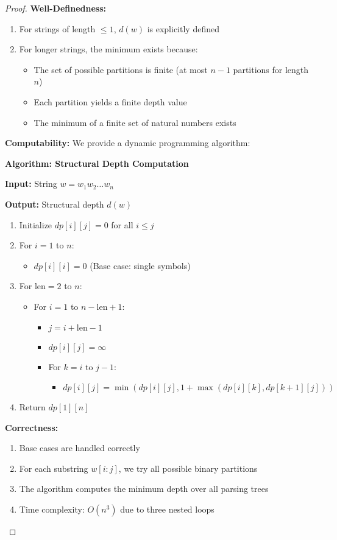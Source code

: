 \documentclass[11pt]{article}
\theoremstyle{definition}
\begin{document}
\begin{proof}
\textbf{Well-Definedness:}
\begin{enumerate}
\item For strings of length $\leq 1$, $d(w)$ is explicitly defined
\item For longer strings, the minimum exists because:
  \begin{itemize}
  \item The set of possible partitions is finite (at most $n-1$ partitions for length $n$)
  \item Each partition yields a finite depth value
  \item The minimum of a finite set of natural numbers exists
  \end{itemize}
\end{enumerate}

\textbf{Computability:}
We provide a dynamic programming algorithm:

\textbf{Algorithm: Structural Depth Computation}

\textbf{Input:} String $w = w_1w_2\ldots w_n$

\textbf{Output:} Structural depth $d(w)$

\begin{enumerate}
\item Initialize $dp[i][j] = 0$ for all $i \leq j$
\item For $i = 1$ to $n$:
   \begin{itemize}
   \item $dp[i][i] = 0$ (Base case: single symbols)
   \end{itemize}
\item For $\text{len} = 2$ to $n$:
   \begin{itemize}
   \item For $i = 1$ to $n-\text{len}+1$:
      \begin{itemize}
      \item $j = i + \text{len} - 1$
      \item $dp[i][j] = \infty$
      \item For $k = i$ to $j-1$:
         \begin{itemize}
         \item $dp[i][j] = \min(dp[i][j], 1 + \max(dp[i][k], dp[k+1][j]))$
         \end{itemize}
      \end{itemize}
   \end{itemize}
\item Return $dp[1][n]$
\end{enumerate}

\textbf{Correctness:}
\begin{enumerate}
\item Base cases are handled correctly
\item For each substring $w[i:j]$, we try all possible binary partitions
\item The algorithm computes the minimum depth over all parsing trees
\item Time complexity: $O(n^3)$ due to three nested loops
\end{enumerate}
\end{proof}
\end{document}
